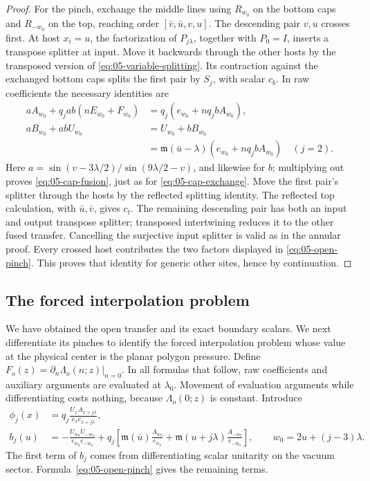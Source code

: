 \begin{proof}
For the pinch, exchange the middle lines using \(R_{w_0}\) on the bottom caps and \(R_{-w_0}\) on the top, reaching order \([\bar v,\bar u,v,u]\). The descending pair \(v,u\) crosses first. At host \(x_i=u\), the factorization of \(P_{j\lambda}\), together with \(P_0=I\), inserts a transpose splitter at input. Move it backwards through the other hosts by the transposed version of \eqref{eq:05-variable-splitting}. Its contraction against the exchanged bottom caps splits the first pair by \(S_j\), with scalar \(c_b\). In raw coefficients the necessary identities are
\begin{equation}
 \begin{aligned}
 aA_{w_0}+q_jab(nE_{w_0}+F_{w_0})
   &=q_j(e_{w_0}+nq_jbA_{w_0}),\\
 aB_{w_0}+abU_{w_0}
   &=U_{w_0}+bB_{w_0}\\
   &=\mathfrak m(\bar u-\lambda)
                  (e_{w_0}+nq_jbA_{w_0})\quad(j=2).
 \end{aligned}
 \label{eq:05-cap-fusion}
\end{equation}
Here \(a=\sin(v-3\lambda/2)/\sin(9\lambda/2-v)\), and likewise for \(b\); multiplying out proves \eqref{eq:05-cap-fusion}, just as for \eqref{eq:05-cap-exchange}. Move the first pair's splitter through the hosts by the reflected splitting identity. The reflected top calculation, with \(\bar u,\bar v\), gives \(c_t\). The remaining descending pair has both an input and output transpose splitter; transposed intertwining reduces it to the other fused transfer. Cancelling the surjective input splitter is valid as in the annular proof. Every crossed host contributes the two factors displayed in \eqref{eq:05-open-pinch}. This proves that identity for generic other sites, hence by continuation.
\end{proof}

\subsection{The forced interpolation problem}

We have obtained the open transfer and its exact boundary scalars.
We next differentiate its pinches to identify the forced interpolation
problem whose value at the physical center is the planar polygon
pressure. Define \(F_o(z)=\partial_n\Lambda_o(n;z)|_{n=0}\). In all formulas that follow, raw coefficients and auxiliary arguments are evaluated at \(\lambda_0\). Movement of evaluation arguments while differentiating costs nothing, because \(\Lambda_o(0;z)\) is constant. Introduce
\begin{equation}
 \begin{aligned}
 \phi_j(x)&=q_j\frac{U_xA_{x+j\lambda}}{e_xe_{x+j\lambda}},\\
 b_j(u)&=-\frac{U_{w_0}U_{-w_0}}{e_{w_0}e_{-w_0}}
  +q_j\left[
      \mathfrak m(\bar u)\frac{A_{w_0}}{e_{w_0}}
      +\mathfrak m(u+j\lambda)\frac{A_{-w_0}}{e_{-w_0}}
       \right],\qquad w_0=2u+(j-3)\lambda.
 \end{aligned}
 \label{eq:05-open-forcing}
\end{equation}
The first term of \(b_j\) comes from differentiating scalar unitarity on the vacuum sector. Formula~\eqref{eq:05-open-pinch} gives the remaining terms.

